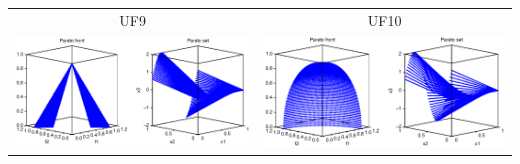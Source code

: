 \begin{table}[]
{\begin{tabular}{cc}
UF9 & UF10 \\
\includegraphics[scale=0.5]{Figures_Chapter2/UF9.eps} & \includegraphics[scale=0.5]{Figures_Chapter2/UF10.eps}
\end{tabular}%
}
\end{table}


